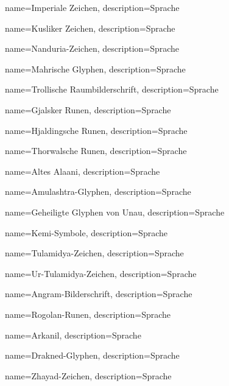 {
    name={Imperiale Zeichen},
    description={Sprache}
}


{
    name={Kusliker Zeichen},
    description={Sprache}
}


{
    name={Nanduria-Zeichen},
    description={Sprache}
}


{
    name={Mahrische Glyphen},
    description={Sprache}
}


{
    name={Trollische Raumbilderschrift},
    description={Sprache}
}


{
    name={Gjalsker Runen},
    description={Sprache}
}


{
    name={Hjaldingsche Runen},
    description={Sprache}
}


{
    name={Thorwalsche Runen},
    description={Sprache}
}


{
    name={Altes Alaani},
    description={Sprache}
}


{
    name={Amulashtra-Glyphen},
    description={Sprache}
}


{
    name={Geheiligte Glyphen von Unau},
    description={Sprache}
}


{
    name={Kemi-Symbole},
    description={Sprache}
}


{
    name={Tulamidya-Zeichen},
    description={Sprache}
}


{
    name={Ur-Tulamidya-Zeichen},
    description={Sprache}
}


{
    name={Angram-Bilderschrift},
    description={Sprache}
}


{
    name={Rogolan-Runen},
    description={Sprache}
}


{
    name={Arkanil},
    description={Sprache}
}


{
    name={Drakned-Glyphen},
    description={Sprache}
}


{
    name={Zhayad-Zeichen},
    description={Sprache}
}


